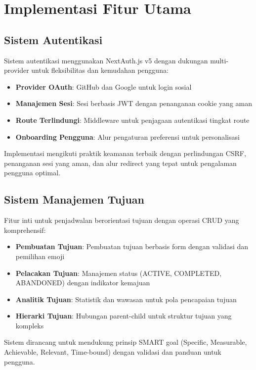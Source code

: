 \section{Implementasi Fitur Utama}

\subsection{Sistem Autentikasi}

Sistem autentikasi menggunakan NextAuth.js v5 dengan dukungan multi-provider untuk fleksibilitas dan kemudahan pengguna:

\begin{itemize}
\item \textbf{Provider OAuth}: GitHub dan Google untuk login sosial
\item \textbf{Manajemen Sesi}: Sesi berbasis JWT dengan penanganan cookie yang aman
\item \textbf{Route Terlindungi}: Middleware untuk penjagaan autentikasi tingkat route
\item \textbf{Onboarding Pengguna}: Alur pengaturan preferensi untuk personalisasi
\end{itemize}

Implementasi mengikuti praktik keamanan terbaik dengan perlindungan CSRF, penanganan sesi yang aman, dan alur redirect yang tepat untuk pengalaman pengguna optimal.

\subsection{Sistem Manajemen Tujuan}

Fitur inti untuk penjadwalan berorientasi tujuan dengan operasi CRUD yang komprehensif:

\begin{itemize}
\item \textbf{Pembuatan Tujuan}: Pembuatan tujuan berbasis form dengan validasi dan pemilihan emoji
\item \textbf{Pelacakan Tujuan}: Manajemen status (ACTIVE, COMPLETED, ABANDONED) dengan indikator kemajuan
\item \textbf{Analitik Tujuan}: Statistik dan wawasan untuk pola pencapaian tujuan
\item \textbf{Hierarki Tujuan}: Hubungan parent-child untuk struktur tujuan yang kompleks
\end{itemize}

Sistem dirancang untuk mendukung prinsip SMART goal (Specific, Measurable, Achievable, Relevant, Time-bound) dengan validasi dan panduan untuk pengguna.

